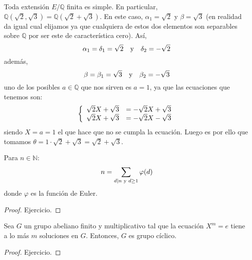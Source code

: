\documentclass[12pt]{report}
\theoremstyle{largebreak}
\begin{document}
    \begin{exa}
        Toda extensión $E/\mathbb{Q}$ finita es simple. En particular, $\mathbb{Q}(\sqrt{2},\sqrt{3})=\mathbb{Q}(\sqrt{2}+\sqrt{3})$. En este caso, $\alpha_1=\sqrt{2}$ y $\beta=\sqrt{3}$ (en realidad da igual cual elijamos ya que cualquiera de estos dos elementos son separables sobre $\mathbb{Q}$ por ser este de característica cero). Así,
        \begin{equation*}
            \alpha_1=\delta_1=\sqrt{2}\quad\textup{y}\quad\delta_2=-\sqrt{2}
        \end{equation*}
        además,
        \begin{equation*}
            \beta=\beta_1=\sqrt{3}\quad\textup{y}\quad\beta_2=-\sqrt{3}
        \end{equation*}
        uno de los posibles $a\in\mathbb{Q}$ que nos sirven es $a=1$, ya que las ecuaciones que tenemos son:
        \begin{equation*}
            \left\{
                \begin{array}[]{rl}
                    \sqrt{2}X+\sqrt{3}&=-\sqrt{2}X+\sqrt{3}\\
                    \sqrt{2}X+\sqrt{3}&=-\sqrt{2}X-\sqrt{3}\\
                \end{array}
            \right.
        \end{equation*}
        siendo $X=a=1$ el que hace que no se cumpla la ecuación. Luego es por ello que tomamos $\theta=1\cdot\sqrt{2}+\sqrt{3}=\sqrt{2}+\sqrt{3}$.
    \end{exa}

    \begin{lema}
        Para $n\in\mathbb{N}$:
        \begin{equation*}
            n=\sum_{d| n\textup{ y }d\geq 1}\varphi(d)
        \end{equation*}
        donde $\varphi$ es la función de Euler.
    \end{lema}

    \begin{proof}
        Ejercicio.
    \end{proof}

    \begin{lema}
        Sea $G$ un grupo abeliano finito y multiplicativo tal que la ecuación $X^{m}=e$ tiene a lo más $m$ soluciones en $G$. Entonces, $G$ es grupo cíclico.
    \end{lema}

    \begin{proof}
        Ejercicio.
    \end{proof}
\end{document}
